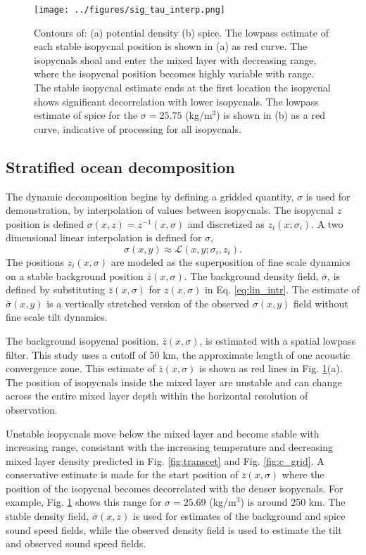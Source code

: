 \documentclass[preprint,NumberedRefs]{JASA}
\begin{document}
\begin{figure}
\texttt{[image: ../figures/sig\_tau\_interp.png]}
    \caption{\label{fig:cntrs}{Contours of: (a) potential density (b) spice. The lowpass estimate of each stable isopycnal position is shown in (a) as red curve. The isopycnals shoal and enter the mixed layer with decreasing range, where the isopycnal position becomes highly variable with range. The stable isopycnal estimate ends at the first location the isopycnal shows significant decorrelation with lower isopycnals. The lowpass estimate of spice for the $\sigma=25.75$ (kg/m$^3$) is shown in (b) as a red curve, indicative of processing for all isopycnals.}}
\end{figure}

\subsection{Stratified ocean decomposition}
The dynamic decomposition begins by defining a gridded quantity, $\sigma$ is used for demonstration, by interpolation of values between isopycnals. The isopycnal $z$ position is defined $\sigma(x, z) = z^{-1}(x, \sigma)$ and discretized as $z_i(x; \sigma_i)$. A two dimensional linear interpolation is defined for $\sigma$,
\begin{equation}
    \sigma(x,y)\approx\mathcal{L}(x, y; \sigma_i, z_i).
    \label{eq:lin_intr}
\end{equation}
The positions $z_i(x, \sigma)$ are modeled as the superposition of fine scale dynamics on a stable background position $\bar{z}(x, \sigma)$. The background density field, $\bar{\sigma}$, is defined by substituting $\bar{z}(x, \sigma)$ for $z(x, \sigma)$ in Eq. \eqref{eq:lin_intr}. The estimate of $\bar{\sigma}(x,y)$ is a vertically stretched version of the observed $\sigma(x,y)$ field without fine scale tilt dynamics.

The background isopycnal position, $\bar{z}(x, \sigma)$, is estimated with a spatial lowpass filter. This study uses a cutoff of 50 km, the approximate length of one acoustic convergence zone\cite{jensen2011computational}. This estimate of $\bar{z}(x, \sigma)$ is shown as red lines in Fig. \ref{fig:cntrs}(a). The position of isopycnals inside the mixed layer are unstable and can change across the entire mixed layer depth within the horizontal resolution of observation. 

Unstable isopycnals move below the mixed layer and become stable with increasing range, consistant with the increasing temperature and decreasing mixed layer density predicted in Fig. \ref{fig:transcet} and Fig. \ref{fig:c_grid}. A conservative estimate is made for the start position of $\bar{z}(x, \sigma)$ where the position of the isopycnal becomes decorrelated with the denser isopycnals. For example, Fig. \ref{fig:cntrs} shows this range for $\sigma=25.69$ (kg/m$^3$) is around 250 km. The stable density field, $\bar{\sigma}(x,z)$ is used for estimates of the background and spice sound speed fields, while the observed density field is used to estimate the tilt and observed sound speed fields.
\end{document}
